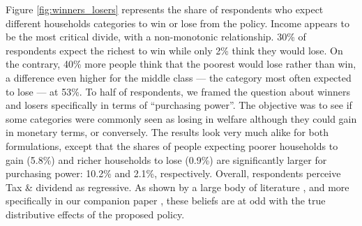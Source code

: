 \documentclass[english,5p,authoryear]{elsarticle}
\begin{document}
Figure \ref{fig:winners_losers} represents the share of respondents who expect different households categories to win or lose from the policy. Income appears to be the most critical divide, with a non-monotonic relationship. 30\% of respondents expect the richest to win while only 2\% think they would lose. On the contrary, 40\% more people think that the poorest would lose rather than win, a difference even higher for the middle class --- the category most often expected to lose --- at 53\%. To half of respondents, we framed the question about winners and losers specifically in terms of ``purchasing power''. The objective was to see if some categories were commonly seen as losing in welfare although they could gain in monetary terms, or conversely. The results look very much alike for both formulations, except that the shares of people expecting poorer households to gain (5.8\%) and richer households to lose (0.9\%) are significantly larger for purchasing power: 10.2\% and 2.1\%, respectively. Overall, respondents perceive Tax \& dividend as regressive. As shown by a large body of literature \citep[e.g.][]{west_williams_04,bento_distributional_2009,williams_initial_2015}, and more specifically in our companion paper \citep{douenne_can_2019}, these beliefs are at odd with the true distributive effects of the proposed policy. %
\end{document}
